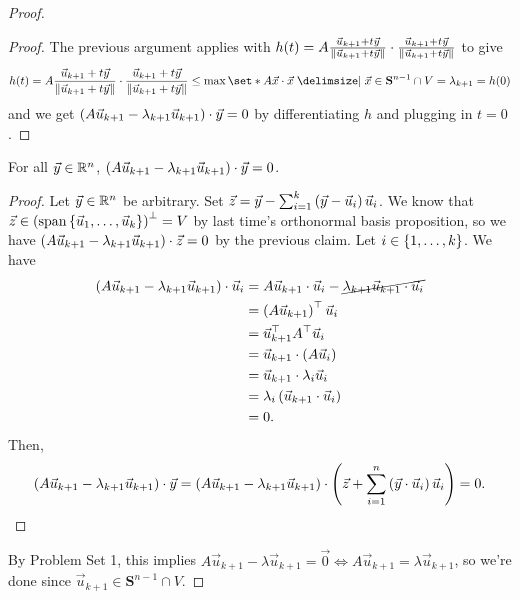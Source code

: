 \documentclass[main.tex]{subfiles}
\begin{document}
\begin{proof}
    \begin{proof}
        The previous argument applies with $h(t) = A\frac{\vec{u}_{k + 1} + t\vec{y}}{\left\lVert \vec{u}_{k + 1} + t\vec{y} \right\rVert} \cdot \frac{\vec{u}_{k + 1} + t\vec{y}}{\left\lVert \vec{u}_{k + 1} + t\vec{y} \right\rVert}$ to give
        \[h(t) = A\frac{\vec{u}_{k + 1} + t\vy}{\norm{\vec{u}_{k + 1} + t\vy}} \cdot \frac{\vec{u}_{k + 1} + t\vy}{\norm{\vec{u}_{k + 1} + t\vy}} \le \max\set*{A\vx\cdot\vx \mid \vx\in \mathbf{S}^{n - 1} \cap V} = \lambda_{k + 1} = h(0)\]
        and we get $\left( A\vec{u}_{k + 1} - \lambda_{k + 1}\vec{u}_{k + 1} \right)\cdot \vec{y} = 0$ by differentiating $h$ and plugging in $t = 0$.
    \end{proof}

    \begin{claim}
        For all $\vec{y} \in \mathbb R^n$, $\left( A\vec{u}_{k + 1} - \lambda_{k + 1}\vec{u}_{k + 1} \right)\cdot \vec{y} = 0$.
    \end{claim}

    \begin{proof}
        Let $\vec{y}\in \mathbb R^n$ be arbitrary. Set $\vec{z} = \vec{y} - \sum_{i = 1}^k \left( \vec{y} - \vec{u}_i \right)\vec{u}_i$. We know that $\vec{z}\in \left( \operatorname{span}\left\{ \vec{u}_1, \ldots , \vec{u}_k \right\} \right)^\perp = V$ by last time's orthonormal basis proposition, so we have $\left( A\vec{u}_{k + 1} - \lambda_{k + 1}\vec{u}_{k + 1} \right)\cdot \vec{z} = 0$ by the previous claim. Let $i\in \left\{ 1, \ldots , k \right\}$. We have
        \begin{align*}
        \left( A\vec{u}_{k + 1} - \lambda_{k + 1}\vec{u}_{k + 1} \right)\cdot \vec{u}_i &= A\vec{u}_{k + 1}\cdot \vec{u}_i - \cancel{\lambda_{k + 1}\vec{u}_{k + 1}\cdot \vec{u}_i} \\
        &= \left( A\vec{u}_{k + 1} \right)^\top \vec{u}_i \\
        &= \vec{u}_{k + 1}^\top A^\top\vec{u}_i \\
        &= \vec{u}_{k + 1}\cdot \left( A\vec{u}_i \right) \\
        &= \vec{u}_{k + 1}\cdot \lambda_i\vec{u}_i \\
        &= \lambda_i\left( \vec{u}_{k + 1}\cdot \vec{u}_i \right) \\
        &= 0.
        \end{align*}
        Then,
        \[\left( A\vec{u}_{k + 1} - \lambda_{k + 1}\vec{u}_{k + 1} \right)\cdot \vec{y} = \left( A\vec{u}_{k + 1} - \lambda_{k + 1}\vec{u}_{k + 1} \right)\cdot \left( \vec{z} + \sum_{i = 1}^n \left( \vec{y} \cdot \vec{u}_i \right)\vec{u}_i \right) = 0.\]
    \end{proof}
    By Problem Set 1, this implies $A\vec{u}_{k + 1} - \lambda\vec{u}_{k + 1} = \vec{0}\iff A\vec{u}_{k + 1} = \lambda\vec{u}_{k + 1}$, so we're done since $\vec{u}_{k + 1}\in \mathbf{S}^{n - 1} \cap V$.
\end{proof}
\end{document}
